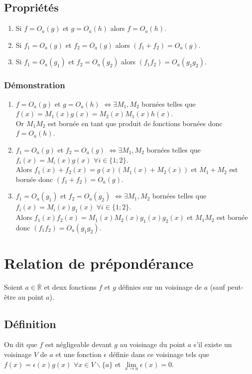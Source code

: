 \documentclass[a4paper,10pt]{book} %
\newcommand{\Rb}{\overline{\mathbb{R}}}
\begin{document}
\subsection{Propriétés}
\begin{enumerate}
\item Si $f=O_a(g)$ et $g=O_a(h)$ alors $f=O_a(h)$.\\
\item Si $f_1=O_a(g)$ et $f_2=O_a(g)$ alors $(f_1+f_2)=O_a(g)$.\\
\item Si $f_1=O_a(g_1)$ et $f_2=O_a(g_2)$ alors $(f_1f_2)=O_a(g_1g_2)$.
\end{enumerate}

\subsubsection{Démonstration}
\begin{enumerate}
\item $f=O_a(g)$ et $g=O_a(h)$ $\Leftrightarrow \exists M_1,M_2$ bornées telles que $f(x)=M_1(x)g(x)=M_2(x)M_1(x)h(x)$.\\
Or $M_1M_2$ est bornée en tant que produit de fonctions bornées donc $f=O_a(h)$.\\
\item $f_1=O_a(g)$ et $f_2=O_a(g)$ $\Leftrightarrow \exists M_1,M_2$ bornées telles que $f_i(x)=M_i(x)g(x)$ $\forall i\in \{1;2\}$.\\
Alors $f_1(x)+f_2(x)=g(x)(M_1(x)+M_2(x))$ et $M_1+M_2$ est bornée donc $(f_1+f_2)=O_a(g)$.\\
\item $f_1=O_a(g_1)$ et $f_2=O_a(g_2)$ $\Leftrightarrow \exists M_1,M_2$ bornées telles que $f_i(x)=M_i(x)g_1(x)$ $\forall i\in \{1;2\}$.\\
Alors $f_1(x)f_2(x)=M_1(x)M_2(x)g_1(x)g_2(x)$ et $M_1M_2$ est bornée donc $(f_1f_2)=O_a(g_1g_2)$.
\end{enumerate}

\newpage

\section{Relation de prépondérance}\label{negligeable}
Soient $a \in \Rb$ et deux fonctions $f$ et $g$ définies sur un voisinage de $a$ (sauf peut-être au point $a$).

\subsection{Définition}
On dit que $f$ est négligeable devant $g$ au voisinage du point $a$ s'il existe un voisinage $V$ de $a$ et une fonction $\epsilon$ définie dans ce voisinage tels que $f(x)=\epsilon(x)g(x)$ $\forall x\in V\backslash \{a\}$ et $\lim\limits_{x\rightarrow a}\epsilon(x)=0$.\\
\end{document}
